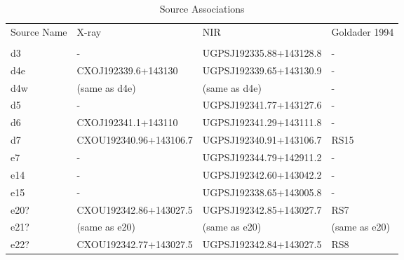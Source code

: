 \begin{table*}[htp]
\caption{Source Associations}
\begin{tabular}{llll}
\label{tab:associations}
Source Name & X-ray & NIR & Goldader 1994 \\
 &  &  &  \\
\hline
d3 & - & UGPSJ192335.88+143128.8 & - \\
d4e & CXOJ192339.6+143130 & UGPSJ192339.65+143130.9 & - \\
d4w & (same as d4e) & (same as d4e) & - \\
d5 & - & UGPSJ192341.77+143127.6 & - \\
d6 & CXOJ192341.1+143110 & UGPSJ192341.29+143111.8 & - \\
d7 & CXOU192340.96+143106.7 & UGPSJ192340.91+143106.7 & RS15 \\
e7 & - & UGPSJ192344.79+142911.2 & - \\
e14 & - & UGPSJ192342.60+143042.2 & - \\
e15 & - & UGPSJ192338.65+143005.8 & - \\
e20? & CXOU192342.86+143027.5 & UGPSJ192342.85+143027.7 & RS7 \\
e21? & (same as e20) & (same as e20) & (same as e20) \\
e22? & CXOU192342.77+143027.5 & UGPSJ192342.84+143027.5 & RS8 \\
\hline
\end{tabular}

\end{table*}
